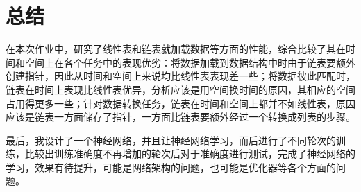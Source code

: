 \section{总结}
在本次作业中，研究了线性表和链表就加载数据等方面的性能，综合比较了其在时间和空间上在各个任务中的表现优劣：将数据加载到数据结构中时由于链表要额外创建指针，因此从时间和空间上来说均比线性表表现差一些；将数据彼此匹配时，链表在时间上表现比线性表优异，分析应该是用空间换时间的原因，其相应的空间占用得更多一些；针对数据转换任务，链表在时间和空间上都并不如线性表，原因应该是链表一方面储存了指针，一方面比链表要额外经过一个转换成列表的步骤。

最后，我设计了一个神经网络，并且让神经网络学习，而后进行了不同轮次的训练，比较出训练准确度不再增加的轮次后对于准确度进行测试，完成了神经网络的学习，效果有待提升，可能是网络架构的问题，也可能是优化器等各个方面的问题。
